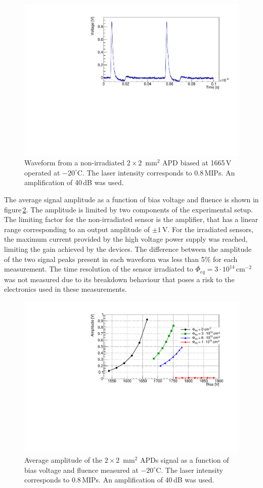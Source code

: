 \documentclass[review,number,sort&compress]{elsarticle}
\begin{document}
\begin{figure}
  \centering
  \includegraphics[width = 0.6 \columnwidth]{APD_394-1-51_1665V_evt1100_2pulses}
  \caption{Waveform from a non-irradiated $2 \times 2$~mm$^2$ APD biased at 1665\,V operated at $-20^\circ$C. The laser intensity corresponds to 0.8\,MIPs. An amplification of 40\,dB was used.}
  \label{fig:pulses2x2timing}
\end{figure}

The average signal amplitude as a function of bias voltage and fluence is shown in figure\,\ref{fig:ampli2x2}.
The amplitude is limited by two components of the experimental setup.
The limiting factor for the non-irradiated sensor is the amplifier, that has a linear range corresponding to an output amplitude of $\pm 1$\,V.
For the irradiated sensors, the maximum current provided by the high voltage power supply was reached, limiting the gain achieved by the devices.
The difference between the amplitude of the two signal peaks present in each waveform was less than 5\% for each measurement.
The time resolution of the sensor irradiated to $\Phi_{eq} = 3 \cdot 10^{14}$\,cm$^{-2}$ was not measured due to its breakdown behaviour that poses a risk to the electronics used in these measurements.

\begin{figure}
  \centering
  \includegraphics[width = 0.6 \columnwidth]{ampli2x2APDs}
  \caption{Average amplitude of the $2 \times 2$~mm$^2$ APDs signal as a function of bias voltage and fluence measured at $-20^\circ$C. The laser intensity corresponds to 0.8\,MIPs. An amplification of 40\,dB was used.}
  \label{fig:ampli2x2}
\end{figure}
\end{document}
